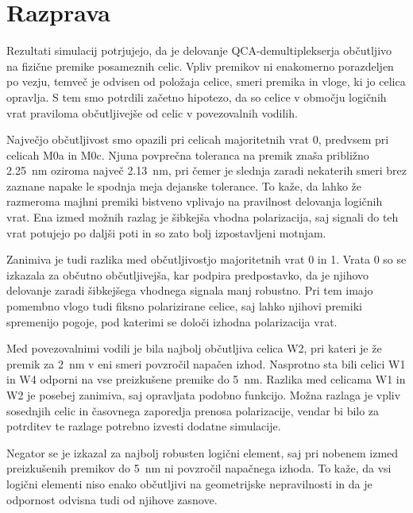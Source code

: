 \section{Razprava}

\label{g27:sec:razprava}

Rezultati simulacij potrjujejo, da je delovanje QCA-demultiplekserja občutljivo na fizične premike posameznih celic. Vpliv premikov ni enakomerno porazdeljen po vezju, temveč je odvisen od položaja celice, smeri premika in vloge, ki jo celica opravlja. S tem smo potrdili začetno hipotezo, da so celice v območju logičnih vrat praviloma občutljivejše od celic v povezovalnih vodilih.

Največjo občutljivost smo opazili pri celicah majoritetnih vrat 0, predvsem pri celicah M0a in M0c. Njuna povprečna toleranca na premik znaša približno \SI{2,25}{\nano\metre} oziroma največ \SI{2,13}{\nano\metre}, pri čemer je slednja zaradi nekaterih smeri brez zaznane napake le spodnja meja dejanske tolerance. To kaže, da lahko že razmeroma majhni premiki bistveno vplivajo na pravilnost delovanja logičnih vrat. Ena izmed možnih razlag je šibkejša vhodna polarizacija, saj signali do teh vrat potujejo po daljši poti in so zato bolj izpostavljeni motnjam.

Zanimiva je tudi razlika med občutljivostjo majoritetnih vrat 0 in 1. Vrata 0 so se izkazala za občutno občutljivejša, kar podpira predpostavko, da je njihovo delovanje zaradi šibkejšega vhodnega signala manj robustno. Pri tem imajo pomembno vlogo tudi fiksno polarizirane celice, saj lahko njihovi premiki spremenijo pogoje, pod katerimi se določi izhodna polarizacija vrat.

Med povezovalnimi vodili je bila najbolj občutljiva celica W2, pri kateri je že premik za \SI{2}{\nano\metre} v eni smeri povzročil napačen izhod. Nasprotno sta bili celici W1 in W4 odporni na vse preizkušene premike do \SI{5}{\nano\metre}. Razlika med celicama W1 in W2 je posebej zanimiva, saj opravljata podobno funkcijo. Možna razlaga je vpliv sosednjih celic in časovnega zaporedja prenosa polarizacije, vendar bi bilo za potrditev te razlage potrebno izvesti dodatne simulacije.

Negator se je izkazal za najbolj robusten logični element, saj pri nobenem izmed preizkušenih premikov do \SI{5}{\nano\metre} ni povzročil napačnega izhoda. To kaže, da vsi logični elementi niso enako občutljivi na geometrijske nepravilnosti in da je odpornost odvisna tudi od njihove zasnove.

